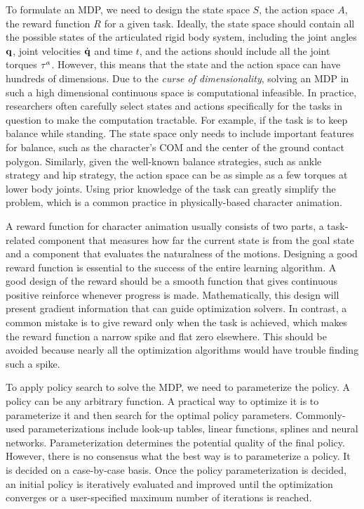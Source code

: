 To formulate an MDP, we need to design the state space $S$, the action space $A$, the reward function $R$ for a given task. Ideally, the state space should contain all the possible states of the articulated rigid body system, including the joint angles $\mathbf{q}$, joint velocities $\dot{\mathbf{q}}$ and time $t$, and the actions should include all the joint torques $\mathbf{\tau}^a$. However, this means that the state and the action space can have hundreds of dimensions. Due to the \emph{curse of dimensionality}, solving an MDP in such a high dimensional continuous space is computational infeasible. In practice, researchers often carefully select states and actions specifically for the tasks in question to make the computation tractable. For example, if the task is to keep balance while standing. The state space only needs to include important features for balance, such as the character's COM and the center of the ground contact polygon. Similarly, given the well-known balance strategies, such as ankle strategy and hip strategy, the action space can be as simple as a few torques at lower body joints. Using prior knowledge of the task can greatly simplify the problem, which is a common practice in physically-based character animation. 

A reward function for character animation usually consists of two parts, a task-related component that measures how far the current state is from the goal state and a component that evaluates the naturalness of the motions. Designing a good reward function is essential to the success of the entire learning algorithm. A good design of the reward should be a smooth function that gives continuous positive reinforce whenever progress is made. Mathematically, this design will present gradient information that can guide optimization solvers. In contrast, a common mistake is to give reward only when the task is achieved, which makes the reward function a narrow spike and flat zero elsewhere. This should be avoided because nearly all the optimization algorithms would have trouble finding such a spike.

To apply policy search to solve the MDP, we need to parameterize the policy. A policy can be any arbitrary function. A practical way to optimize it is to parameterize it and then search for the optimal policy parameters. Commonly-used parameterizations include look-up tables, linear functions, splines and neural networks. Parameterization determines the potential quality of the final policy. However, there is no consensus what the best way is to parameterize a policy. It is decided on a case-by-case basis. Once the policy parameterization is decided, an initial policy is iteratively evaluated and improved until the optimization converges or a user-specified maximum number of iterations is reached.


